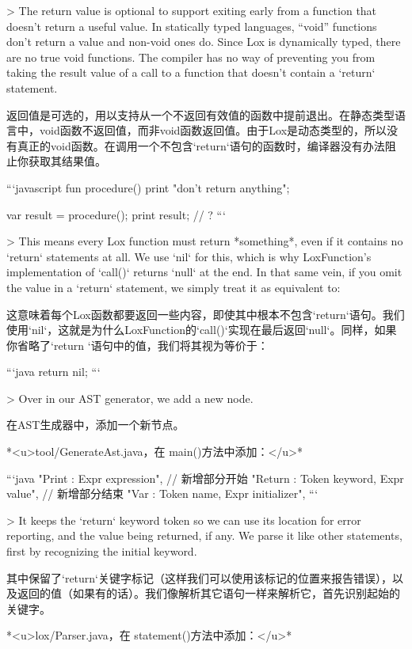 \documentclass[cn,11pt,chinese]{elegantbook}
\begin{document}
{{{{{{{{> The return value is optional to support exiting early from a function that doesn’t return a useful value. In statically typed languages, “void” functions don’t return a value and non-void ones do. Since Lox is dynamically typed, there are no true void functions. The compiler has no way of preventing you from taking the result value of a call to a function that doesn’t contain a `return` statement.

返回值是可选的，用以支持从一个不返回有效值的函数中提前退出。在静态类型语言中，void函数不返回值，而非void函数返回值。由于Lox是动态类型的，所以没有真正的void函数。在调用一个不包含`return`语句的函数时，编译器没有办法阻止你获取其结果值。

```javascript
fun procedure() {
  print "don't return anything";
}

var result = procedure();
print result; // ?
```

> This means every Lox function must return *something*, even if it contains no `return` statements at all. We use `nil` for this, which is why LoxFunction’s implementation of `call()` returns `null` at the end. In that same vein, if you omit the value in a `return` statement, we simply treat it as equivalent to:

这意味着每个Lox函数都要返回一些内容，即使其中根本不包含`return`语句。我们使用`nil`，这就是为什么LoxFunction的`call()`实现在最后返回`null`。同样，如果你省略了`return `语句中的值，我们将其视为等价于：

```java
return nil;
```

> Over in our AST generator, we add a new node.

在AST生成器中，添加一个新节点。

*<u>tool/GenerateAst.java，在 main()方法中添加：</u>*

```java
      "Print      : Expr expression",
      // 新增部分开始
      "Return     : Token keyword, Expr value",
      // 新增部分结束
      "Var        : Token name, Expr initializer",
```

> It keeps the `return` keyword token so we can use its location for error reporting, and the value being returned, if any. We parse it like other statements, first by recognizing the initial keyword.

其中保留了`return`关键字标记（这样我们可以使用该标记的位置来报告错误），以及返回的值（如果有的话）。我们像解析其它语句一样来解析它，首先识别起始的关键字。

*<u>lox/Parser.java，在 statement()方法中添加：</u>*

}}}}}}}}
\end{document}
